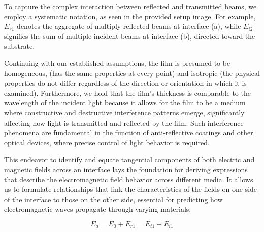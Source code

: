 To capture the complex interaction between reflected and transmitted beams, we employ a systematic notation, as seen in the provided setup image. For example, $E_{r1}$ denotes the aggregate of multiply reflected beams at interface (a), while $E_{i2}$ signifies the sum of multiple incident beams at interface (b), directed toward the substrate. %

Continuing with our established assumptions, the film is presumed to be homogeneous, (has the same properties at every point) and isotropic (the physical properties do not differ regardless of the direction or orientation in which it is examined). Furthermore, we hold that the film's thickness is comparable to the wavelength of the incident light because it allows for the film to be a medium where constructive and destructive interference patterns emerge, significantly affecting how light is transmitted and reflected by the film. Such interference phenomena are fundamental in the function of anti-reflective coatings and other optical devices, where precise control of light behavior is required. %


This endeavor to identify and equate tangential components of both electric and magnetic fields across an interface lays the foundation for deriving expressions that describe the electromagnetic field behavior across different media. It allows us to formulate relationships that link the characteristics of the fields on one side of the interface to those on the other side, essential for predicting how electromagnetic waves propagate through varying materials.

    \begin{equation} \label{E_a - Multilayer films electric field boundary equations}
    E_a = E_0 + E_{r1} = E_{t1} + E_{i1}
    \end{equation}
    
